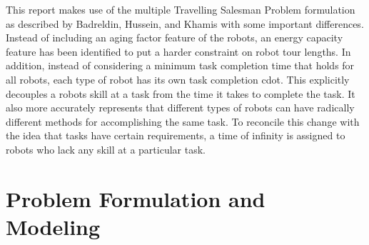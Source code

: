 \documentclass[a4paper]{article}
\begin{document}
This report makes use of the multiple Travelling Salesman Problem formulation as described by Badreldin, Hussein, and Khamis with some important differences. \cite{Badreldin} Instead of including an aging factor feature of the robots, an energy capacity feature has been identified to put a harder constraint on robot tour lengths. In addition, instead of considering a minimum task completion time that holds for all robots, each type of robot has its own task completion cdot. This explicitly decouples a robots skill at a task from the time it takes to complete the task. It also more accurately represents that different types of robots can have radically different methods for accomplishing the same task. To reconcile this change with the idea that tasks have certain requirements, a time of infinity is assigned to robots who lack any skill at a particular task.




%

\section{Problem Formulation and Modeling}

\end{document}
